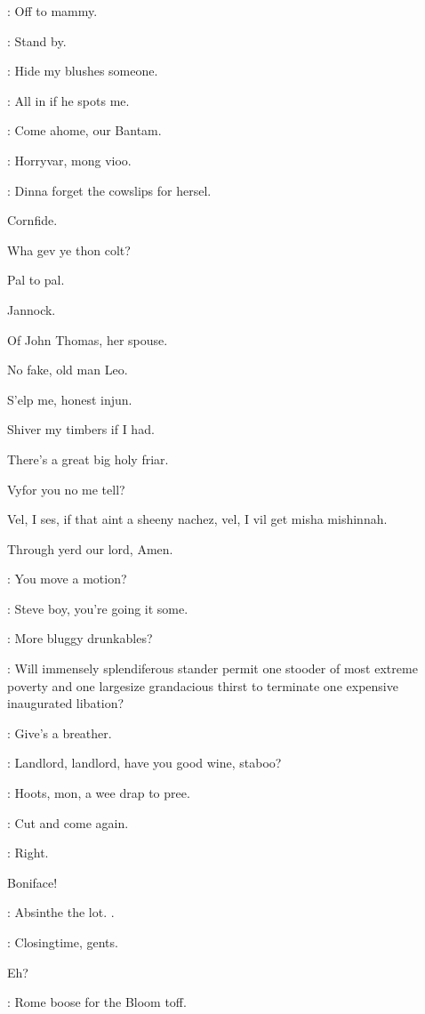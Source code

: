 \madden:
Off to mammy.

\dixon:
Stand by.

\madden:
Hide my blushes someone.


\Bloom:
All in if he spots me.

\punch:
Come ahome,
our Bantam.

\dixon:
Horryvar,
mong vioo.

\crotthers:
Dinna forget the cowslips for hersel.

Cornfide.

Wha gev ye thon colt?

Pal to pal.

Jannock.

Of John Thomas,
her spouse.

No fake,
old man Leo.

S'elp me,
honest injun.

Shiver my timbers if I had.

There's a great big holy friar.

Vyfor you no me tell?

Vel,
I ses,
if that aint a sheeny nachez,
vel,
I vil get misha mishinnah.

Through yerd our lord,
Amen.


\stephen:
You move a motion?

\lenehan:
Steve boy,
you're going it some.

\dixon:
More bluggy drunkables?

\lynch:
Will immensely splendiferous stander permit one stooder of
most extreme poverty and one largesize grandacious thirst to terminate
one expensive inaugurated libation?

\crotthers:
Give's a breather.

\punch:
Landlord,
landlord,
have you good wine,
staboo?

\crotthers:
Hoots,
mon,
a wee drap to pree.

\lenehan:
Cut and come again.

\barman:
Right.

Boniface!

\stephen:
Absinthe the lot.
.

\barman:
Closingtime,
gents.

Eh?

\stephen:
Rome boose for the Bloom toff.


